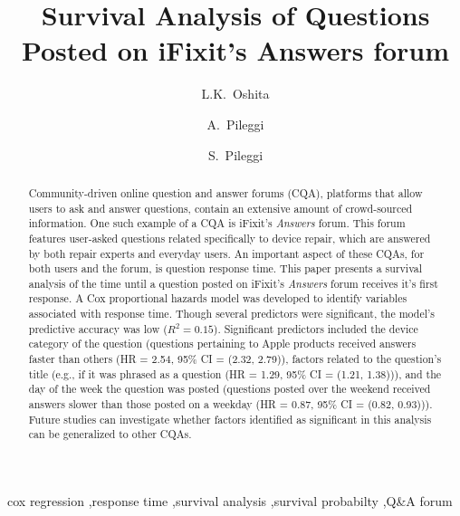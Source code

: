\documentclass[preprint]{elsarticle}
\begin{document}
\begin{frontmatter}
\title{Survival Analysis of Questions Posted on iFixit's Answers forum}

\author[cp]{L.K.~Oshita}

\author[ifixit]{A.~Pileggi}
\author[cp]{S.~Pileggi}

\address[cp]{California Polytechnic State University, San Luis Obispo, CA 93407, United States}
\address[ifixit]{iFixit, 1330 Monterey St, San Luis Obispo, CA 93401, United States}

\begin{abstract} 
Community-driven online question and answer forums (CQA), platforms that allow users to ask and answer questions, contain an extensive amount of crowd-sourced information. One such example of a CQA is iFixit's \textit{Answers} forum. This forum features user-asked questions related specifically to device repair, which are answered by both repair experts and everyday users. An important aspect of these CQAs, for both users and the forum, is question response time. This paper presents a survival analysis of the time until a question posted on iFixit's \textit{Answers} forum receives it's first response. A Cox proportional hazards model was developed to identify variables associated with response time. Though several predictors were significant, the model's predictive accuracy was low ($R^2 = 0.15$). Significant predictors included the device category of the question (questions pertaining to Apple products received answers faster than others (HR = 2.54, 95\% CI = (2.32, 2.79)), factors related to the question's title (e.g., if it was phrased as a question (HR = 1.29, 95\% CI = (1.21, 1.38))), and the day of the week the question was posted (questions posted over the weekend received answers slower than those posted on a weekday (HR = 0.87, 95\% CI = (0.82, 0.93))). Future studies can investigate whether factors identified as significant in this analysis can be generalized to other CQAs.
\end{abstract}

\begin{keyword}
cox regression \sep response time \sep survival analysis \sep survival probabilty \sep Q\&A forum 
\end{keyword}

\end{frontmatter}

\end{document}
